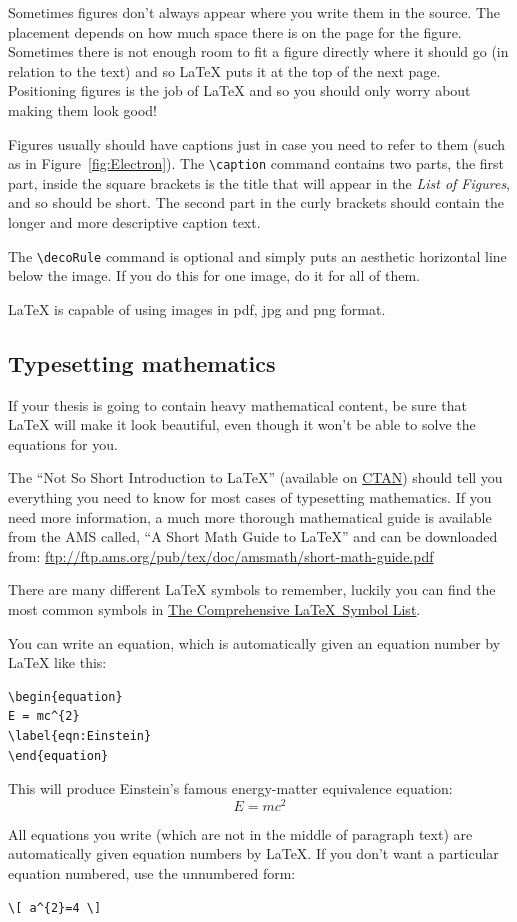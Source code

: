 Sometimes figures don't always appear where you write them in the source. The placement depends on how much space there is on the page for the figure. Sometimes there is not enough room to fit a figure directly where it should go (in relation to the text) and so \LaTeX{} puts it at the top of the next page. Positioning figures is the job of \LaTeX{} and so you should only worry about making them look good!

Figures usually should have captions just in case you need to refer to them (such as in Figure~\ref{fig:Electron}). The \verb|\caption| command contains two parts, the first part, inside the square brackets is the title that will appear in the \emph{List of Figures}, and so should be short. The second part in the curly brackets should contain the longer and more descriptive caption text.

The \verb|\decoRule| command is optional and simply puts an aesthetic horizontal line below the image. If you do this for one image, do it for all of them.

\LaTeX{} is capable of using images in pdf, jpg and png format.

\subsection{Typesetting mathematics}

If your thesis is going to contain heavy mathematical content, be sure that \LaTeX{} will make it look beautiful, even though it won't be able to solve the equations for you.

The \enquote{Not So Short Introduction to \LaTeX} (available on \href{http://www.ctan.org/tex-archive/info/lshort/english/lshort.pdf}{CTAN}) should tell you everything you need to know for most cases of typesetting mathematics. If you need more information, a much more thorough mathematical guide is available from the AMS called, \enquote{A Short Math Guide to \LaTeX} and can be downloaded from:
\url{ftp://ftp.ams.org/pub/tex/doc/amsmath/short-math-guide.pdf}

There are many different \LaTeX{} symbols to remember, luckily you can find the most common symbols in \href{http://ctan.org/pkg/comprehensive}{The Comprehensive \LaTeX~Symbol List}.

You can write an equation, which is automatically given an equation number by \LaTeX{} like this:
\begin{verbatim}
\begin{equation}
E = mc^{2}
\label{eqn:Einstein}
\end{equation}
\end{verbatim}

This will produce Einstein's famous energy-matter equivalence equation:
\begin{equation}
E = mc^{2}
\label{eqn:Einstein}
\end{equation}

All equations you write (which are not in the middle of paragraph text) are automatically given equation numbers by \LaTeX{}. If you don't want a particular equation numbered, use the unnumbered form:
\begin{verbatim}
\[ a^{2}=4 \]
\end{verbatim}


